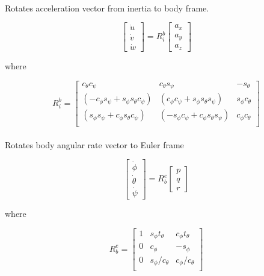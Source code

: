 \documentclass[]{article}
\begin{document}
\paragraph*{}
Rotates acceleration vector from inertia to body frame.

\begin{equation}
	\begin{bmatrix}
		\dot{u} \\
		\dot{v}\\
		\dot{w}
	\end{bmatrix} = 
	R_{i}^{b}
	\begin{bmatrix}
		a_x \\
		a_y \\
		a_z
	\end{bmatrix}
\end{equation}

where 

\begin{equation}
	R_{i}^b = 
	\begin{bmatrix}
		c_\theta c_\psi & c_\theta s_\psi & -s_\theta\\
		(-c_\phi s_\psi + s_\phi s_\theta c_\psi) & (c_\phi c_\psi + s_\phi s_\theta s_\psi) & s_\phi c_\theta\\
		(s_\phi s_\psi + c_\phi s_\theta c_\psi) & (-s_\phi c_\psi + c_\phi s_\theta s_\psi) & c_\phi c_\theta\\
	\end{bmatrix}
\end{equation}

\paragraph*{}
Rotates body angular rate vector to Euler frame

\begin{equation}
	\begin{bmatrix}
		\dot{\phi} \\
		\dot{\theta}\\
		\dot{\psi}
	\end{bmatrix} = 
	R_{b}^{e}
	\begin{bmatrix}
		p \\
		q \\
		r
	\end{bmatrix}
\end{equation}

where 

\begin{equation}
R_{b}^e = 
\begin{bmatrix}
1 & s_\phi t_\theta & c_\phi t_\theta\\
0 & c_\phi & -s_\phi\\
0 & s_\phi/c_\theta & c_\phi/c_\theta\\
\end{bmatrix}
\end{equation}
\end{document}
